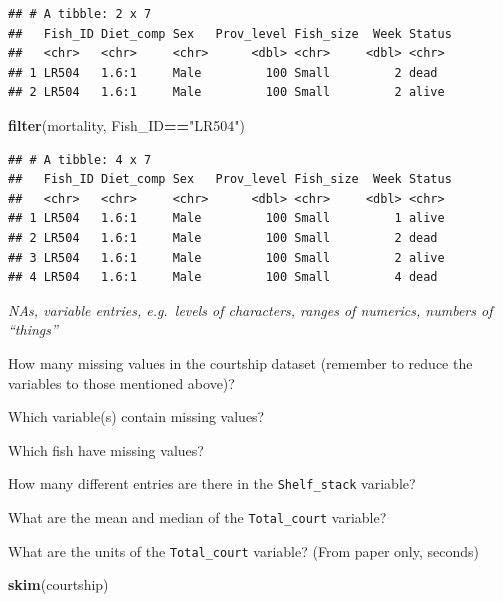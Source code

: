 \documentclass[]{book}
\newenvironment{Shaded}{\begin{snugshade}}{\end{snugshade}}
\newcommand{\KeywordTok}[1]{\textcolor[rgb]{0.13,0.29,0.53}{\textbf{#1}}}
\newcommand{\NormalTok}[1]{#1}
\newcommand{\OperatorTok}[1]{\textcolor[rgb]{0.81,0.36,0.00}{\textbf{#1}}}
\newcommand{\StringTok}[1]{\textcolor[rgb]{0.31,0.60,0.02}{#1}}
\begin{document}
\begin{verbatim}
## # A tibble: 2 x 7
##   Fish_ID Diet_comp Sex   Prov_level Fish_size  Week Status
##   <chr>   <chr>     <chr>      <dbl> <chr>     <dbl> <chr> 
## 1 LR504   1.6:1     Male         100 Small         2 dead  
## 2 LR504   1.6:1     Male         100 Small         2 alive
\end{verbatim}

\begin{Shaded}
\begin{Highlighting}[]
\KeywordTok{filter}\NormalTok{(mortality, Fish_ID}\OperatorTok{==}\StringTok{"LR504"}\NormalTok{)}
\end{Highlighting}
\end{Shaded}

\begin{verbatim}
## # A tibble: 4 x 7
##   Fish_ID Diet_comp Sex   Prov_level Fish_size  Week Status
##   <chr>   <chr>     <chr>      <dbl> <chr>     <dbl> <chr> 
## 1 LR504   1.6:1     Male         100 Small         1 alive 
## 2 LR504   1.6:1     Male         100 Small         2 dead  
## 3 LR504   1.6:1     Male         100 Small         2 alive 
## 4 LR504   1.6:1     Male         100 Small         4 dead
\end{verbatim}

\emph{NAs, variable entries, e.g.~levels of characters, ranges of numerics, numbers of ``things''}

How many missing values in the courtship dataset (remember to reduce the variables to those mentioned above)?

Which variable(s) contain missing values?

Which fish have missing values?

How many different entries are there in the \texttt{Shelf\_stack} variable?

What are the mean and median of the \texttt{Total\_court} variable?

What are the units of the \texttt{Total\_court} variable? (From paper only, seconds)

\begin{Shaded}
\begin{Highlighting}[]
\KeywordTok{skim}\NormalTok{(courtship)}
\end{Highlighting}
\end{Shaded}
\end{document}

